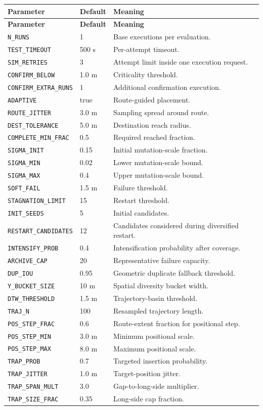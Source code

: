 \documentclass[11pt,a4paper,openany]{report}
\newcommand{\code}[1]{\texttt{#1}}
\begin{document}
\begin{longtable}{L{4.3cm} L{2.4cm} L{7.8cm}}
\toprule
\textbf{Parameter} & \textbf{Default} & \textbf{Meaning}\\
\midrule
\endfirsthead
\toprule
\textbf{Parameter} & \textbf{Default} & \textbf{Meaning}\\
\midrule
\endhead
\code{N\_RUNS} & 1 & Base executions per evaluation.\\
\code{TEST\_TIMEOUT} & 500 s & Per-attempt timeout.\\
\code{SIM\_RETRIES} & 3 & Attempt limit inside one execution request.\\
\code{CONFIRM\_BELOW} & 1.0 m & Criticality threshold.\\
\code{CONFIRM\_EXTRA\_RUNS} & 1 & Additional confirmation execution.\\
\code{ADAPTIVE} & true & Route-guided placement.\\
\code{ROUTE\_JITTER} & 3.0 m & Sampling spread around route.\\
\code{DEST\_TOLERANCE} & 5.0 m & Destination reach radius.\\
\code{COMPLETE\_MIN\_FRAC} & 0.5 & Required reached fraction.\\
\code{SIGMA\_INIT} & 0.15 & Initial mutation-scale fraction.\\
\code{SIGMA\_MIN} & 0.02 & Lower mutation-scale bound.\\
\code{SIGMA\_MAX} & 0.4 & Upper mutation-scale bound.\\
\code{SOFT\_FAIL} & 1.5 m & Failure threshold.\\
\code{STAGNATION\_LIMIT} & 15 & Restart threshold.\\
\code{INIT\_SEEDS} & 5 & Initial candidates.\\
\code{RESTART\_CANDIDATES} & 12 & Candidates considered during diversified restart.\\
\code{INTENSIFY\_PROB} & 0.4 & Intensification probability after coverage.\\
\code{ARCHIVE\_CAP} & 20 & Representative failure capacity.\\
\code{DUP\_IOU} & 0.95 & Geometric duplicate fallback threshold.\\
\code{Y\_BUCKET\_SIZE} & 10 m & Spatial diversity bucket width.\\
\code{DTW\_THRESHOLD} & 1.5 m & Trajectory-basin threshold.\\
\code{TRAJ\_N} & 100 & Resampled trajectory length.\\
\code{POS\_STEP\_FRAC} & 0.6 & Route-extent fraction for positional step.\\
\code{POS\_STEP\_MIN} & 3.0 m & Minimum positional scale.\\
\code{POS\_STEP\_MAX} & 8.0 m & Maximum positional scale.\\
\code{TRAP\_PROB} & 0.7 & Targeted insertion probability.\\
\code{TRAP\_JITTER} & 1.0 m & Target-position jitter.\\
\code{TRAP\_SPAN\_MULT} & 3.0 & Gap-to-long-side multiplier.\\
\code{TRAP\_SIZE\_FRAC} & 0.35 & Long-side cap fraction.\\
\bottomrule
\end{longtable}
\end{document}
